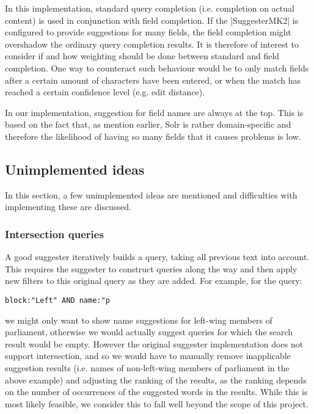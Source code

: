 In this implementation, standard query completion (i.e. completion on actual content) is used in conjunction with field completion. If the |SuggesterMK2| is configured to provide suggestions for many fields, the field completion might overshadow the ordinary query completion results.
It is therefore of interest to consider if and how weighting should be done between standard and field completion. One way to counteract such behaviour would be to only match fields after a certain amount of characters have been entered, or when the match has reached a certain confidence level (e.g. edit distance).

In our implementation, suggestion for field names are always at the top. This is based on the fact that, as mention earlier,  Solr is rather domain-specific and therefore the likelihood of having so many fields that it causes problems is low.

\subsection{Unimplemented ideas}

In this section, a few unimplemented ideas are mentioned and difficulties with implementing these are discussed. 

\subsubsection{Intersection queries}

A good suggester iteratively builds a query, taking all previous text into account. This requires the suggester to construct queries along the way and then apply new filters to this original query as they are added. For example, for the query:
\begin{verbatim}
block:"Left" AND name:"p
\end{verbatim}
we might only want to show name suggestions for left-wing members of parliament, otherwise we would actually suggest queries for which the search result would be empty.
However the original suggester implementation does not support intersection, and so we would have to manually remove inapplicable suggestion results (i.e. names of non-left-wing members of parliament in the above example) and adjusting the ranking of the results, as the ranking depends on the number of occurrences of the suggested words in the results. While this is most likely feasible, we consider this to fall well beyond the scope of this project.

